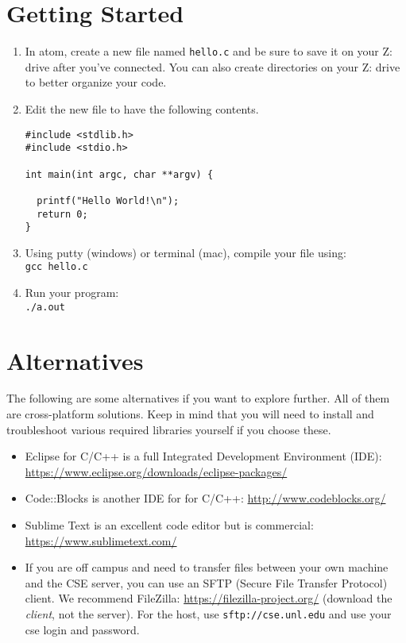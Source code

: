 \documentclass[12pt]{scrartcl}
\begin{document}
\section*{Getting Started}

\begin{enumerate}
  \item In atom, create a new file named \texttt{hello.c} and be sure to 
save it on your Z: drive after you've connected.  You can also create directories
on your Z: drive to better organize your code.  
  \item Edit the new file to have the following contents.
\begin{verbatim}
#include <stdlib.h>
#include <stdio.h>

int main(int argc, char **argv) {

  printf("Hello World!\n");
  return 0;
}
\end{verbatim}
  \item Using putty (windows) or terminal (mac), compile your file using:\\
  \texttt{gcc hello.c}
  \item Run your program:\\
  \texttt{./a.out}
\end{enumerate}

\section*{Alternatives}

The following are some alternatives if you want to explore further.
All of them are cross-platform solutions.  Keep in mind that you will
need to install and troubleshoot various required libraries yourself if
you choose these.
\begin{itemize} 
  \item Eclipse for C/C++ is a full Integrated Development Environment (IDE):
  \url{https://www.eclipse.org/downloads/eclipse-packages/}
  \item Code::Blocks is another IDE for for C/C++: \url{http://www.codeblocks.org/}
  \item Sublime Text is an excellent code editor but is commercial: \url{https://www.sublimetext.com/}
  \item If you are off campus and need to transfer files between your 
  own machine and the CSE server, you can use an SFTP (Secure File Transfer
  Protocol) client.  We recommend FileZilla: \url{https://filezilla-project.org/}
  (download the \emph{client}, not the server).  For the host, use 
  \texttt{sftp://cse.unl.edu} and use your cse login and password.
\end{itemize}


  
\end{document}
